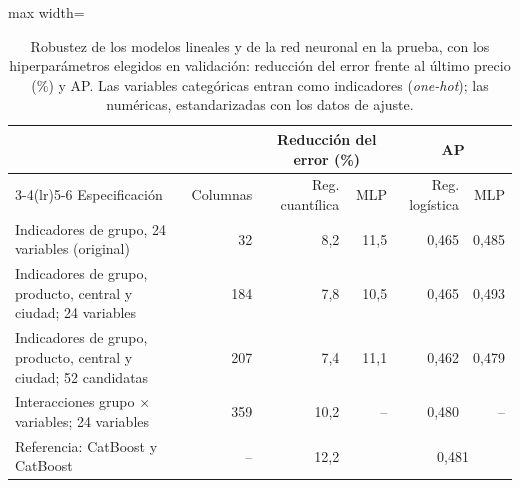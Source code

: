 \begin{table}[htbp]\centering\small
\caption{Robustez de los modelos lineales y de la red neuronal en la prueba, con los hiperparámetros elegidos en validación: reducción del error frente al último precio (\%) y AP. Las variables categóricas entran como indicadores (\emph{one-hot}); las numéricas, estandarizadas con los datos de ajuste.}\label{tab:lineales}
\begin{adjustbox}{max width=\textwidth}\begin{tabular}{lrrrrr}\toprule
& & \multicolumn{2}{c}{Reducción del error (\%)} & \multicolumn{2}{c}{AP}\\ \cmidrule(lr){3-4}\cmidrule(lr){5-6}
Especificación & Columnas & Reg. cuantílica & MLP & Reg. logística & MLP\\ \midrule
Indicadores de grupo, 24 variables (original) & 32 & 8{,}2 & 11{,}5 & 0{,}465 & 0{,}485 \\
Indicadores de grupo, producto, central y ciudad; 24 variables & 184 & 7{,}8 & 10{,}5 & 0{,}465 & 0{,}493 \\
Indicadores de grupo, producto, central y ciudad; 52 candidatas & 207 & 7{,}4 & 11{,}1 & 0{,}462 & 0{,}479 \\
Interacciones grupo × variables; 24 variables & 359 & 10{,}2 & -- & 0{,}480 & -- \\
\midrule
Referencia: CatBoost y CatBoost & -- & \multicolumn{2}{c}{12{,}2} & \multicolumn{2}{c}{0{,}481} \\
\bottomrule\end{tabular}\end{adjustbox}\end{table}
